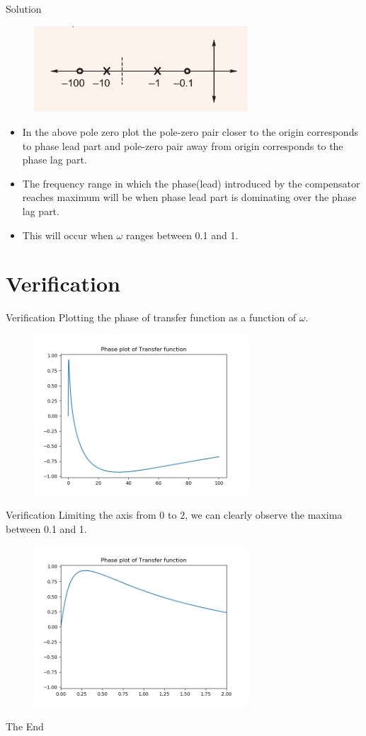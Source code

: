 \documentclass{beamer}
\begin{document}
\begin{frame}{Solution}
\begin{figure}
\includegraphics[width=8cm]{Screenshot (30).png}
\end{figure}
\begin{itemize}
    \item In the above pole zero plot the pole-zero pair closer to the origin corresponds to phase lead part and pole-zero pair away from origin corresponds to the phase lag part.
    \item The frequency range in which the phase(lead) introduced by the compensator reaches maximum will be when phase lead part is dominating over the phase lag part.
    \item This will occur when $\omega$ ranges between 0.1 and 1.
\end{itemize}
\end{frame}
\section{Verification}
\begin{frame}{Verification}
Plotting the phase of transfer function as a function of $\omega$. 
\begin{figure}
\includegraphics[width=8cm]{ptotal.png}
\end{figure}
\end{frame}

\begin{frame}{Verification}
Limiting the axis from 0 to 2, we can clearly observe the maxima between 0.1 and 1. 
\begin{figure}
\includegraphics[width=8cm]{puntil2.png}
\end{figure}
\end{frame}


\begin{frame}
\huge{\centerline{The End}}
\end{frame}
\end{document}
